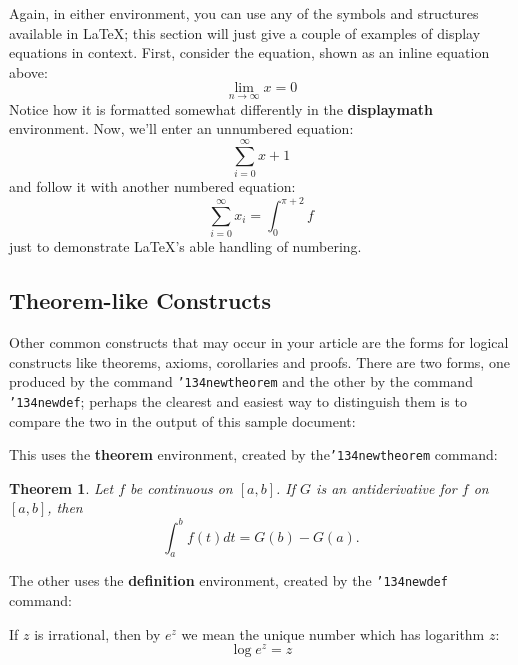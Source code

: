 \documentclass{nime-alternate} %
\begin{document}
Again, in either environment, you can use any of the symbols
and structures available in \LaTeX; this section will just
give a couple of examples of display equations in context.
First, consider the equation, shown as an inline equation above:
\begin{equation}\lim_{n\rightarrow \infty}x=0\end{equation}
Notice how it is formatted somewhat differently in
the \textbf{displaymath}
environment.  Now, we'll enter an unnumbered equation:
\begin{displaymath}\sum_{i=0}^{\infty} x + 1\end{displaymath}
and follow it with another numbered equation:
\begin{equation}\sum_{i=0}^{\infty}x_i=\int_{0}^{\pi+2} f\end{equation}
just to demonstrate \LaTeX's able handling of numbering.



\subsection{Theorem-like Constructs}
Other common constructs that may occur in your article are
the forms for logical constructs like theorems, axioms,
corollaries and proofs.  There are
two forms, one produced by the
command \texttt{{\char'134}newtheorem} and the
other by the command \texttt{{\char'134}newdef}; perhaps
the clearest and easiest way to distinguish them is
to compare the two in the output of this sample document:

This uses the \textbf{theorem} environment, created by
the\linebreak\texttt{{\char'134}newtheorem} command:
\newtheorem{theorem}{Theorem}
\begin{theorem}
Let $f$ be continuous on $[a,b]$.  If $G$ is
an antiderivative for $f$ on $[a,b]$, then
\begin{displaymath}\int^b_af(t)dt = G(b) - G(a).\end{displaymath}
\end{theorem}

The other uses the \textbf{definition} environment, created
by the \texttt{{\char'134}newdef} command:
\begin{definition}
If $z$ is irrational, then by $e^z$ we mean the
unique number which has
logarithm $z$: \begin{displaymath}{\log e^z = z}\end{displaymath}
\end{definition}
\end{document}
